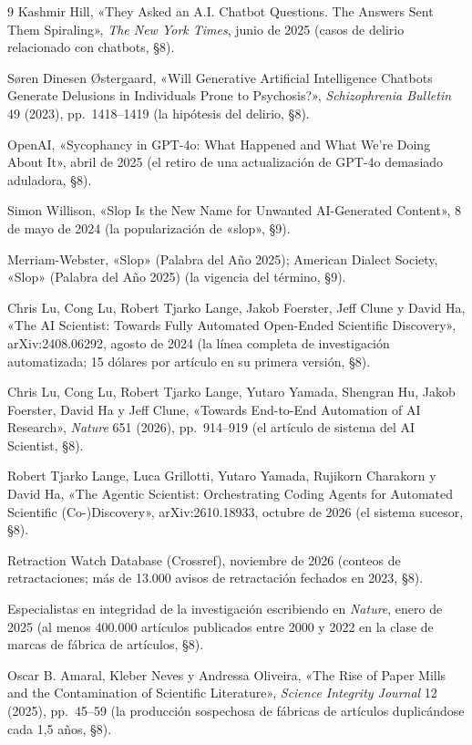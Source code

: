 \documentclass[11pt]{article}
\begin{document}
\begin{thebibliography}{9}
 Kashmir Hill, «They Asked an A.I. Chatbot
Questions. The Answers Sent Them Spiraling», \textit{The New York
Times}, junio de 2025 (casos de delirio relacionado con chatbots, §8).

 S{\o}ren Dinesen {\O}stergaard, «Will
Generative Artificial Intelligence Chatbots Generate Delusions in
Individuals Prone to Psychosis?», \textit{Schizophrenia Bulletin} 49
(2023), pp.~1418--1419 (la hipótesis del delirio, §8).

 OpenAI, «Sycophancy in GPT-4o: What Happened and
What We're Doing About It», abril de 2025 (el retiro de una
actualización de GPT-4o demasiado aduladora, §8).

 Simon Willison, «Slop Is the New Name for
Unwanted AI-Generated Content», 8 de mayo de 2024 (la popularización de
«slop», §9).

 Merriam-Webster, «Slop» (Palabra del Año
2025); American Dialect Society, «Slop» (Palabra del Año 2025) (la
vigencia del término, §9).

 Chris Lu, Cong Lu, Robert Tjarko Lange, Jakob Foerster,
Jeff Clune y David Ha, «The AI Scientist: Towards Fully Automated
Open-Ended Scientific Discovery», arXiv:2408.06292, agosto de 2024 (la
línea completa de investigación automatizada; 15 dólares por artículo en
su primera versión, §8).

 Chris Lu, Cong Lu, Robert Tjarko Lange, Yutaro Yamada,
Shengran Hu, Jakob Foerster, David Ha y Jeff Clune, «Towards
End-to-End Automation of AI Research», \textit{Nature} 651 (2026),
pp.~914--919 (el artículo de sistema del AI Scientist, §8).

 Robert Tjarko Lange, Luca Grillotti, Yutaro Yamada,
Rujikorn Charakorn y David Ha, «The Agentic Scientist: Orchestrating
Coding Agents for Automated Scientific (Co-)Discovery»,
arXiv:2610.18933, octubre de 2026 (el sistema sucesor, §8).

 Retraction Watch Database (Crossref),
noviembre de 2026 (conteos de retractaciones; más de 13.000 avisos de
retractación fechados en 2023, §8).

 Especialistas en integridad de la investigación
escribiendo en \textit{Nature}, enero de 2025 (al menos 400.000
artículos publicados entre 2000 y 2022 en la clase de marcas de fábrica
de artículos, §8).

 Oscar B. Amaral, Kleber Neves y Andressa
Oliveira, «The Rise of Paper Mills and the Contamination of Scientific
Literature», \textit{Science Integrity Journal} 12 (2025),
pp.~45--59 (la producción sospechosa de fábricas de artículos
duplicándose cada 1,5 años, §8).


\end{thebibliography}
\end{document}
